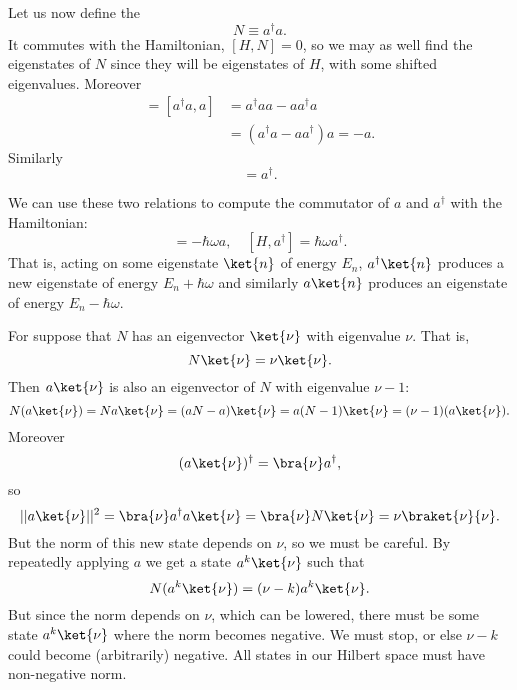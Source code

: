 Let us now define the 
\begin{equation}
    N\equiv a^\dagger a.
\end{equation}
It commutes with the Hamiltonian, $[H,N]=0$, so we may as well find the eigenstates of $N$ since they will be eigenstates of $H$, with some shifted eigenvalues. Moreover
\begin{align}
    [N,a]=[a^\dagger a, a] &=a^\dagger a a - a a^\dagger a\nonumber\\
        &= (a^\dagger a- aa^\dagger)a = -a.
\end{align}
Similarly
\begin{equation}
    [N,a^\dagger]=a^\dagger.
\end{equation}

We can use these two relations to compute the commutator of $a$ and $a^\dagger$ with the Hamiltonian:
\begin{equation}
    [H,a] = -\hbar \omega a,\quad [H,a^\dagger] = \hbar \omega a^\dagger.
\end{equation}
That is, acting on some eigenstate $\ket{n}$ of energy $E_n$, $a^\dagger
\ket{n}$ produces a new eigenstate of energy $E_n+\hbar \omega$ and similarly $a\ket{n}$ produces an eigenstate of energy $E_n-\hbar \omega$.

For suppose that $N$ has an eigenvector $\ket{\nu}$ with eigenvalue $\nu$. That is,
\begin{equation}
    N\ket{\nu} = \nu\ket{\nu}.
\end{equation}
Then $a\ket{\nu}$ is also an eigenvector of $N$ with eigenvalue $\nu-1$:
\begin{equation}
    N(a\ket{\nu})=Na\ket{\nu} = (aN-a) \ket{\nu} =a (N-1) \ket{\nu}= (\nu-1)(a\ket{\nu}).
\end{equation}
Moreover
\begin{equation}
    (a\ket{\nu})^\dagger = \bra{\nu}a^\dagger,
\end{equation}
so
\begin{equation}
    ||a\ket{\nu}||^2 = \bra{\nu} a^\dagger a \ket{\nu} = \bra{\nu} N \ket{\nu} = \nu \braket{\nu}{\nu}.
\end{equation}
But the norm of this new state depends on $\nu$, so we must be careful. By repeatedly applying $a$ we get a state $a^k\ket{\nu}$ such that
\begin{equation}
    N(a^k\ket{\nu})= (\nu-k) a^k\ket{\nu}.
\end{equation}
But since the norm depends on $\nu$, which can be lowered, there must be some state $a^k\ket{\nu}$ where the norm becomes negative. We must stop, or else $\nu-k$ could become (arbitrarily) negative. All states in our Hilbert space must have non-negative norm. 

